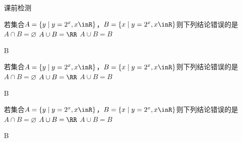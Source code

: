 \begin{exercise}{\heiti 课前检测}
\begin{answer}
     \item %
       若集合$A=\{y\mid y=2^x,x\inR\}$，$B=\{x\mid y=2^x,x\inR\}$则下列结论错误的是\xz
        {$A\cap B=\varnothing$}
        {$A\cup B=\RR$}
        {$A\cup B=B$}
        \begin{answer}
          B
        \end{answer}
      \item %
        若集合$A=\{y\mid y=2^x,x\inR\}$，$B=\{x\mid y=2^x,x\inR\}$则下列结论错误的是\xz
         {$A\cap B=\varnothing$}
         {$A\cup B=\RR$}
         {$A\cup B=B$}
         \begin{answer}
           B
         \end{answer}\end{answer}
    \item %
      若集合$A=\{y\mid y=2^x,x\inR\}$，$B=\{x\mid y=2^x,x\inR\}$则下列结论错误的是\xz
       {$A\cap B=\varnothing$}
       {$A\cup B=\RR$}
       {$A\cup B=B$}
      \begin{answer}
        B
      \end{answer}
    \end{exercise}
